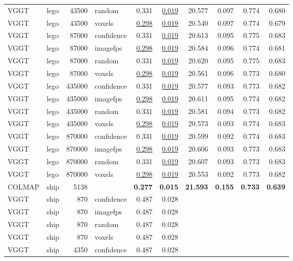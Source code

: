 \begin{table}[H]
\begin{tabular}{llrlrrrrrr}
VGGT & lego & 43500 & random & 0.331 & \underline{0.019} & 20.577 & 0.097 & 0.774 & 0.680 \\
VGGT & lego & 43500 & voxels & \underline{0.298} & \underline{0.019} & 20.540 & 0.097 & 0.774 & 0.679 \\
VGGT & lego & 87000 & confidence & 0.331 & \underline{0.019} & 20.613 & 0.095 & 0.775 & 0.683 \\
VGGT & lego & 87000 & imagefps & \underline{0.298} & \underline{0.019} & 20.584 & 0.096 & 0.774 & 0.681 \\
VGGT & lego & 87000 & random & 0.331 & \underline{0.019} & 20.620 & 0.095 & 0.775 & 0.683 \\
VGGT & lego & 87000 & voxels & \underline{0.298} & \underline{0.019} & 20.561 & 0.096 & 0.773 & 0.680 \\
VGGT & lego & 435000 & confidence & 0.331 & \underline{0.019} & 20.577 & 0.093 & 0.773 & 0.682 \\
VGGT & lego & 435000 & imagefps & \underline{0.298} & \underline{0.019} & 20.611 & 0.095 & 0.774 & 0.682 \\
VGGT & lego & 435000 & random & 0.331 & \underline{0.019} & 20.581 & 0.094 & 0.773 & 0.682 \\
VGGT & lego & 435000 & voxels & \underline{0.298} & \underline{0.019} & 20.573 & 0.093 & 0.774 & 0.683 \\
VGGT & lego & 870000 & confidence & 0.331 & \underline{0.019} & 20.599 & 0.092 & 0.774 & 0.683 \\
VGGT & lego & 870000 & imagefps & \underline{0.298} & \underline{0.019} & 20.606 & 0.093 & 0.773 & 0.683 \\
VGGT & lego & 870000 & random & 0.331 & \underline{0.019} & 20.607 & 0.093 & 0.773 & 0.683 \\
VGGT & lego & 870000 & voxels & \underline{0.298} & \underline{0.019} & 20.553 & 0.092 & 0.773 & 0.682 \\
\midrule
COLMAP & ship & 5138 &  & \textbf{0.277} & \textbf{0.015} & \textbf{21.593} & \textbf{0.155} & \textbf{0.733} & \textbf{0.639} \\
VGGT & ship & 870 & confidence & 0.487 & 0.028 &  &  &  &  \\
VGGT & ship & 870 & imagefps & 0.487 & 0.028 &  &  &  &  \\
VGGT & ship & 870 & random & 0.487 & 0.028 &  &  &  &  \\
VGGT & ship & 870 & voxels & 0.487 & 0.028 &  &  &  &  \\
VGGT & ship & 4350 & confidence & 0.487 & 0.028 &  &  &  &  \\

\end{tabular}
\end{table}

